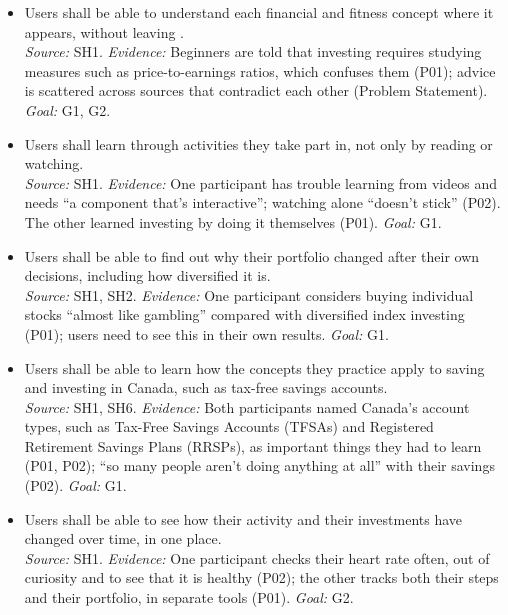 \documentclass[12pt]{article}
\newcounter{srnum} %
\begin{document}
{\sloppy
  \noindent\begin{itemize}
    \item[SR\refstepcounter{srnum}\thesrnum\label{SR_LearnInContext}:] Users shall be able to understand each financial and fitness concept where it appears, without leaving \progname{}.\\
          \emph{Source:} SH1. \emph{Evidence:} Beginners are told that investing requires studying measures such as price-to-earnings ratios, which confuses them (P01); advice is scattered across sources that contradict each other (Problem Statement). \emph{Goal:} G1, G2.
    \item[SR\refstepcounter{srnum}\thesrnum\label{SR_LearnByDoing}:] Users shall learn through activities they take part in, not only by reading or watching.\\
          \emph{Source:} SH1. \emph{Evidence:} One participant has trouble learning from videos and needs ``a component that's interactive''; watching alone ``doesn't stick'' (P02). The other learned investing by doing it themselves (P01). \emph{Goal:} G1.
    \item[SR\refstepcounter{srnum}\thesrnum\label{SR_LearnFromDecisions}:] Users shall be able to find out why their portfolio changed after their own decisions, including how diversified it is.\\
          \emph{Source:} SH1, SH2. \emph{Evidence:} One participant considers buying individual stocks ``almost like gambling'' compared with diversified index investing (P01); users need to see this in their own results. \emph{Goal:} G1.
    \item[SR\refstepcounter{srnum}\thesrnum\label{SR_CanadianContext}:] Users shall be able to learn how the concepts they practice apply to saving and investing in Canada, such as tax-free savings accounts.\\
          \emph{Source:} SH1, SH6. \emph{Evidence:} Both participants named Canada's account types, such as Tax-Free Savings Accounts (TFSAs) and Registered Retirement Savings Plans (RRSPs), as important things they had to learn (P01, P02); ``so many people aren't doing anything at all'' with their savings (P02). \emph{Goal:} G1.
    \item[SR\refstepcounter{srnum}\thesrnum\label{SR_SeeProgress}:] Users shall be able to see how their activity and their investments have changed over time, in one place.\\
          \emph{Source:} SH1. \emph{Evidence:} One participant checks their heart rate often, out of curiosity and to see that it is healthy (P02); the other tracks both their steps and their portfolio, in separate tools (P01). \emph{Goal:} G2.
  \end{itemize}
  \par}
\end{document}
